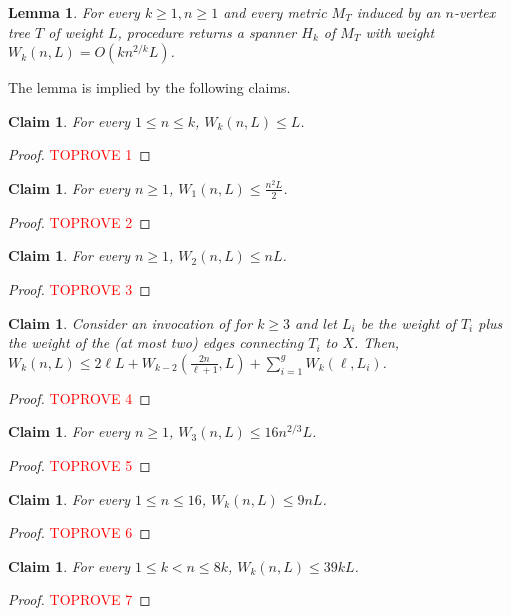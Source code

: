 \documentclass[11pt,english]{article}
\newtheorem{lemma}[theorem]{Lemma}
\newtheorem{claim}[theorem]{Claim}
\begin{document}
\begin{lemma}\label{lem:light}
For every $k \ge 1, n \ge 1$ and every metric $M_T$ induced by an $n$-vertex tree $T$ of weight $L$, procedure  returns a spanner $H_k$ of $M_T$ with weight $W_k(n, L) = O(kn^{2/k}L)$.
\end{lemma}
The lemma is implied by the following claims.

\begin{claim}\label{clm:ub:n-leq-k}
For every $1 \le n \le k$, $W_k(n, L) \le L$.
\end{claim}
\begin{proof}\textcolor{red}{TOPROVE 1}\end{proof}

\begin{claim}
For every $n \ge 1$, $W_1(n, L) \le \frac{n^2L}{2}$.
\end{claim}
\begin{proof}\textcolor{red}{TOPROVE 2}\end{proof}

\begin{claim}
For every $n \ge 1$, $W_2(n, L) \le  nL$.
\end{claim}
\begin{proof}\textcolor{red}{TOPROVE 3}\end{proof}

\begin{claim}
Consider an invocation of  for $k\ge 3$ and let $L_i$ be the weight of $T_i$ plus the weight of the (at most two) edges connecting $T_i$ to $X$.
Then, $W_k(n,L) \le 2\ell L + W_{k-2}\left(\frac{2n}{\ell+1}, L\right) + \sum_{i=1}^g W_k(\ell, L_i)$.
\end{claim}
\begin{proof}\textcolor{red}{TOPROVE 4}\end{proof}

\begin{claim}\label{clm:ub:k-3}
For every $n \ge 1$, $W_3(n, L) \le 16n^{2/3}L$.
\end{claim}
\begin{proof}\textcolor{red}{TOPROVE 5}\end{proof}

\begin{claim} 
For every $1\le n \le 16$, $W_k(n, L) \le 9nL$.
\end{claim}
\begin{proof}\textcolor{red}{TOPROVE 6}\end{proof}
\begin{claim}
For every $1\le k < n \le 8k$, $W_k(n, L) \le 39kL$.
\end{claim}
\begin{proof}\textcolor{red}{TOPROVE 7}\end{proof}
\end{document}
